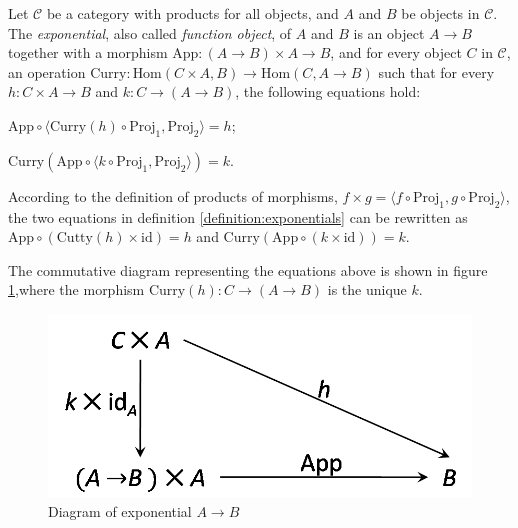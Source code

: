 \begin{definition}
\label{definition:exponentials}
Let $ \mathcal{C} $ be a category with products for all objects, and $ A $ and $ B $ be objects in $ \mathcal{C} $. The \emph{exponential}, also called \emph{function object}, of $ A $ and $ B $ is an object $ A \to B $ together with a morphism $ \text{App} : ( A \to B ) \times A \to B $, and for every object $ C $ in $ \mathcal{C} $, an operation $ \text{Curry} : \text{Hom}(C \times A,B) \to \text{Hom}(C, A \to B) $ such that for every $ h: C \times A \to B $ and $ k: C \to ( A \to B ) $, the following equations hold:
\begin{myitemize}
\item $ \text{App} \circ \langle \text{Curry} (h) \circ \text{Proj}_1 , \text{Proj}_2 \rangle = h $;
\item $ \text{Curry} ( \text{App} \circ \langle k \circ \text{Proj}_1 , \text{Proj}_2 \rangle ) = k $.
\end{myitemize}
\end{definition}

According to the definition of products of morphisms, $ f \times g = \langle f \circ \text{Proj}_1 , g \circ \text{Proj}_2 \rangle $, the two equations in definition \ref{definition:exponentials} can be rewritten as $ \text{App} \circ ( \text{Cutty}(h) \times \text{id} ) = h $ and $ \text{Curry}( \text{App} \circ (k \times \text{id})) = k $.

The commutative diagram representing the equations above is shown in figure \ref{figure:cat_ex},where the morphism $ \text{Curry}(h): C \to (A \to B) $ is the unique $ k $.
\begin{figure}[h!]
\centering
\includegraphics[scale=0.42]{./images/cat_ex}
\caption{Diagram of exponential $ A \to B $}
\label{figure:cat_ex}
\end{figure}

